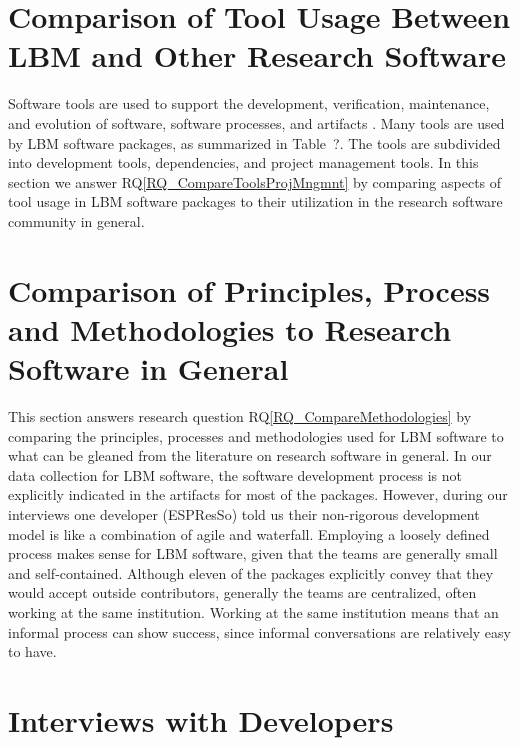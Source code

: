 \documentclass[final, 3p, times, authoryear]{elsarticle}
\newcommand{\rqref}[1]{RQ\ref{#1}}
\begin{document}
\section{Comparison of Tool Usage Between LBM and Other Research Software}
\label{Sec_CompareTools}

Software tools are used to support the development, verification, maintenance,
and evolution of software, software processes, and artifacts \citep[p.\
501]{GhezziEtAl2003}. Many tools are used by LBM software packages, as
summarized in Table~?.  The tools are subdivided into development
tools, dependencies, and project management tools.  In this section we answer
\rqref{RQ_CompareToolsProjMngmnt} by comparing aspects of tool usage in LBM
software packages to their utilization in the research software community in
general.

\section{Comparison of Principles, Process and Methodologies to Research Software in General} \label{Sec_CompareMethodologies}

This section answers research question \rqref{RQ_CompareMethodologies} by
comparing the principles, processes and methodologies used for LBM software to
what can be gleaned from the literature on research software in general. In our
data collection for LBM software, the software development process is not
explicitly indicated in the artifacts for most of the packages. However, during
our interviews one developer (ESPResSo) told us their non-rigorous development
model is like a combination of agile and waterfall. Employing a loosely defined
process makes sense for LBM software, given that the teams are generally small
and self-contained.  Although eleven of the packages explicitly convey that they
would accept outside contributors, generally the teams are centralized, often
working at the same institution.  Working at the same institution means that an
informal process can show success, since informal conversations are relatively
easy to have.

\section{Interviews with Developers} \label{ch_interview}
\end{document}

